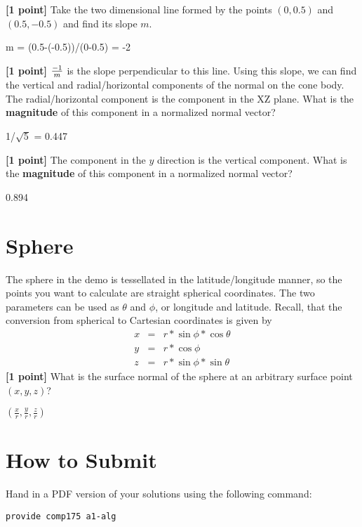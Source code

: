 \documentclass[10pt,twocolumn]{article}
\begin{document}
{\bf [1 point]} Take the two dimensional line formed by the points $(0, 0.5)$ and $(0.5, -0.5)$ and find its slope $m$.
\begin{framed}
m = (0.5-(-0.5))/(0-0.5) = -2
\vspace{6em}
\end{framed}


{\bf [1 point]} ${{-1}\over{m}}$ is the slope perpendicular to this line. Using this slope, we
can find the vertical and radial/horizontal components of the normal on the cone body. The radial/horizontal component is the component in the XZ plane. What is the {\bf magnitude} of this component in a normalized normal vector?
\begin{framed}
1/$\sqrt{5}$ = 0.447
\vspace{6em}
\end{framed}


{\bf [1 point]} The component in the $y$ direction is the vertical component. What is the {\bf magnitude} of this component in a normalized normal vector?
\begin{framed}
0.894
\vspace{6em}
\end{framed}


\section{Sphere}
The sphere in the demo is tessellated in the latitude/longitude manner, so the points you want to calculate are straight spherical coordinates. The two parameters can be used as $\theta$ and $\phi$, or longitude and latitude. Recall, that the conversion from spherical to Cartesian coordinates is given by
\begin{eqnarray*}
x & = & r * \sin{\phi} * \cos{\theta}\\
y & = & r * \cos{\phi}\\
z & = & r * \sin{\phi}*\sin{\theta}
\end{eqnarray*}
{\bf [1 point]} What is the surface normal of the sphere at an arbitrary surface point $(x,y,z)$?
\begin{framed}
$(\frac{x}{r}, \frac{y}{r}, \frac{z}{r})$
\vspace{6em}
\end{framed}


\section{How to Submit}

Hand in a PDF version of your solutions using the following command:
\begin{center}
 {\tt provide comp175 a1-alg}
 \end{center}
\end{document}
